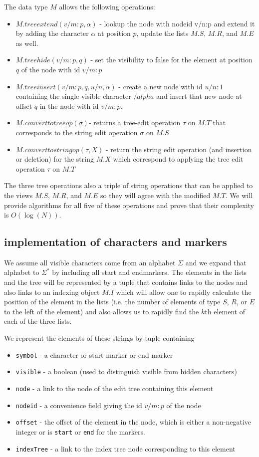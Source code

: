 \documentclass{amsart}
\begin{document}
The data type $M$ allows the following operations:
\begin{itemize}
\item $M.treeextend(v/m:p,\alpha)$ - lookup the node with nodeid v/n:p and extend it by adding the character $\alpha$ at position $p$, update the lists $M.S$, $M.R$, and $M.E$ as well.
\item $M.treehide(v/m:p,q)$ - set the visibility to false for the element at position $q$ of the node with id $v/m:p$
\item $M.treeinsert(v/m:p,q,u/n,\alpha)$ - create a new node with id $u/n:1$ containing the single visible character $/alpha$ and insert that new node at offset $q$ in the node with id $v/m:p$.
\item $M.converttotreeop(\sigma)$- returns a tree-edit operation $\tau$ on $M.T$ that corresponds to the string edit operation $\sigma$ on $M.S$
\item $M.converttostringop(\tau,X)$ - return the string edit operation (and insertion or deletion) for the string $M.X$ which correspond to applying the tree edit operation $\tau$ on $M.T$
\end{itemize}
The three tree operations also a triple of string operations that can be applied to
the views $M.S$, $M.R$, and $M.E$ so they will agree with the modified $M.T$.
We will provide algorithms for all five of these operations and prove that their complexity is $O(\log(N))$.
\subsection{implementation of characters and markers}
We assume all visible characters come from an alphabet $\Sigma$
and we expand that alphabet to $\Sigma^*$ by including all start and endmarkers.
The elements in the lists and the tree will be represented by a tuple that contains links to the nodes and also links to an indexing object $M.I$ which will allow one to rapidly calculate the position of the element in the lists (i.e. the number of elements of type $S$, $R$, or $E$ to the left of the element) and also allows us to rapidly find the $k$th element of each of the three lists.

We represent the elements of these strings by tuple containing
\begin{itemize}
\item {\tt symbol} - a character or start marker or end marker 
\item {\tt visible} - a boolean (used to distinguish visible from hidden characters)
\item {\tt node} - a link to the node of the edit tree containing this element
\item {\tt nodeid} - a convenience field giving the id $v/m:p$ of the node
\item {\tt offset} - the offset of the element in the node, which is either a non-negative integer or is {\tt start} or {\tt end} for the markers.
\item {\tt indexTree} - a link to the index tree node corresponding to this element
\end{itemize}
\end{document}
